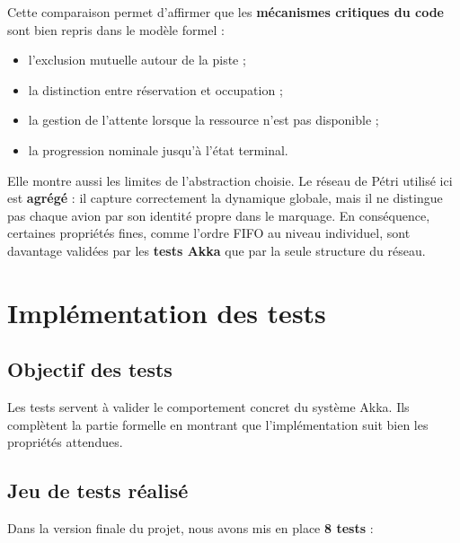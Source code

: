 \documentclass[11pt,a4paper]{article}
\begin{document}
Cette comparaison permet d'affirmer que les \textbf{mécanismes critiques du code} sont bien repris dans le modèle formel :
\begin{itemize}
    \item l'exclusion mutuelle autour de la piste ;
    \item la distinction entre réservation et occupation ;
    \item la gestion de l'attente lorsque la ressource n'est pas disponible ;
    \item la progression nominale jusqu'à l'état terminal.
\end{itemize}

Elle montre aussi les limites de l'abstraction choisie. Le réseau de Pétri utilisé ici est \textbf{agrégé} : il capture correctement la dynamique globale, mais il ne distingue pas chaque avion par son identité propre dans le marquage. En conséquence, certaines propriétés fines, comme l'ordre FIFO au niveau individuel, sont davantage validées par les \textbf{tests Akka} que par la seule structure du réseau.


\section{Implémentation des tests}

\subsection{Objectif des tests}

Les tests servent à valider le comportement concret du système Akka. Ils complètent la partie formelle en montrant que l'implémentation suit bien les propriétés attendues.

\subsection{Jeu de tests réalisé}

Dans la version finale du projet, nous avons mis en place \textbf{8 tests} :
\end{document}
